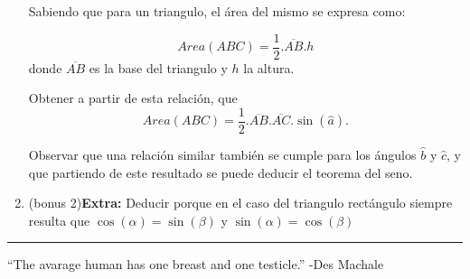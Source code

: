 \documentclass[a4paper,11pt,spanish,sans]{exam}
\begin{document}
\begin{enumerate}
\begin{minipage}{0.3\linewidth}
			
		\end{minipage}
		\begin{minipage}{0.7\linewidth}
			Sabiendo que para un triangulo, el área del mismo se expresa como: 
			
			\[ Area(ABC)=\frac{1}{2}.\overline{AB}.h \] donde $\overline{AB}$ es la base del triangulo y $h$ la altura.
			
			Obtener a partir de esta relación, que \[ Area(ABC)=\frac{1}{2}.\overline{AB}.\overline{AC}.\sin(\hat{a}). \]
			
			Observar que una relación similar también se cumple para los ángulos $\hat{b}$ y $\hat{c}$, y que partiendo de este resultado se puede deducir el teorema del seno. 
		\end{minipage}
		
		\item (bonus 2)\textbf{Extra:}
		Deducir porque en el caso del triangulo rectángulo siempre resulta que $\cos(\alpha)=\sin(\beta)$ y $\sin(\alpha)=\cos(\beta)$ 
		
	\end{enumerate}
	
	\rule[2ex]{\textwidth}{1pt}
	
	“The avarage human has one breast and one testicle.”   -Des Machale
	
	
\newpage
\end{document}
